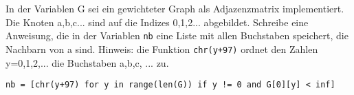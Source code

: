 ﻿\question[3]
In der Variablen G sei ein gewichteter Graph als Adjazenzmatrix implementiert.
Die Knoten a,b,c... sind auf die Indizes 0,1,2... abgebildet.
Schreibe eine Anweisung, die in der Variablen \texttt{nb} eine Liste mit
allen Buchstaben speichert, die Nachbarn von a sind.
Hinweis: die Funktion \texttt{chr(y+97)} ordnet den Zahlen y=0,1,2,... die Buchstaben
a,b,c, ... zu.

\begin{solutionbox}{2cm}
\begin{lstlisting}
nb = [chr(y+97) for y in range(len(G)) if y != 0 and G[0][y] < inf]

\end{lstlisting}
\end{solutionbox}
